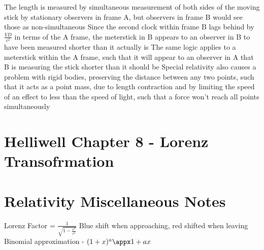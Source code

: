 \documentclass[11 pt, twoside]{article}
\newenvironment{outline*}
{
	\begin{outline}[enumerate]
	}
	{\end{outline}
}
\begin{document}
\begin{outline*}
\2 The length is measured by simultaneous measurement of both sides of the moving stick by stationary observers in frame A, but observers in frame B would see those as non-simultaneous
\2 Since the second clock within frame B lags behind by $\frac{VD}{c^2}$ in terms of the A frame, the meterstick in B appears to an observer in B to have been measured shorter than it actually is
\3 The same logic applies to a meterstick within the A frame, such that it will appear to an observer in A that B is measuring the stick shorter than it should be
\1 Special relativity also causes a problem with rigid bodies, preserving the distance between any two points, such that it acts as a point mass, due to length contraction and by limiting the speed of an effect to less than the speed of light, such that a force won't reach all points simultaneously
\end{outline*}
\section{Helliwell Chapter 8 - Lorenz Transofrmation}
\begin{outline*}

\end{outline*}
\section{Relativity Miscellaneous Notes}
Lorenz Factor = $\frac{1}{\sqrt{1 - \frac{v^2}{c^2}}}$
Blue shift when approaching, red shifted when leaving
Binomial approximation - $(1 + x)^a \appx 1 + ax$
\end{document}
